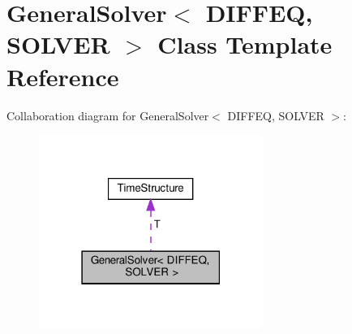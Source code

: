 \hypertarget{classGeneralSolver}{}\section{General\+Solver$<$ D\+I\+F\+F\+EQ, S\+O\+L\+V\+ER $>$ Class Template Reference}
\label{classGeneralSolver}


Collaboration diagram for General\+Solver$<$ D\+I\+F\+F\+EQ, S\+O\+L\+V\+ER $>$\+:
\nopagebreak
\begin{figure}[H]
\begin{center}
\leavevmode
\includegraphics[width=207pt]{classGeneralSolver__coll__graph}
\end{center}
\end{figure}
